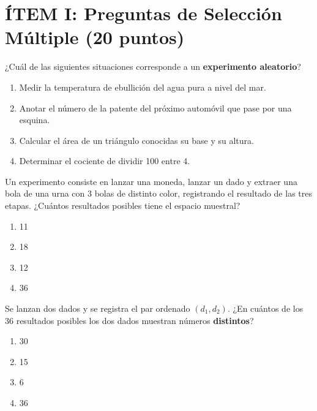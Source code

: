 \documentclass[12pt, a4paper]{article} %
\begin{document}
\newpage

\section*{ÍTEM I: Preguntas de Selección Múltiple (20 puntos)}
\vspace{0.2cm}

\begin{enumerate}[leftmargin=*]

    \begin{minipage}{\linewidth}
    \item ¿Cuál de las siguientes situaciones corresponde a un \textbf{experimento aleatorio}?
    \begin{enumerate}
        \item Medir la temperatura de ebullición del agua pura a nivel del mar.
        \item Anotar el número de la patente del próximo automóvil que pase por una esquina.
        \item Calcular el área de un triángulo conocidas su base y su altura.
        \item Determinar el cociente de dividir 100 entre 4.
    \end{enumerate}
    \end{minipage}
    \vspace{0.5cm}

    \begin{minipage}{\linewidth}
    \item Un experimento consiste en lanzar una moneda, lanzar un dado y extraer una bola de una urna con 3 bolas de distinto color, registrando el resultado de las tres etapas. ¿Cuántos resultados posibles tiene el espacio muestral?
    \begin{enumerate}
        \item 11
        \item 18
        \item 12
        \item 36
    \end{enumerate}
    \end{minipage}
    \vspace{0.5cm}

    \begin{minipage}{\linewidth}
    \item Se lanzan dos dados y se registra el par ordenado $(d_1, d_2)$. ¿En cuántos de los 36 resultados posibles los dos dados muestran números \textbf{distintos}?
    \begin{enumerate}
        \item 30
        \item 15
        \item 6
        \item 36
    \end{enumerate}
    \end{minipage}
    \vspace{0.5cm}


\end{enumerate}
\end{document}
